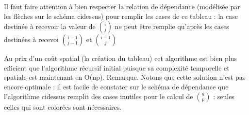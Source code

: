 \documentclass[letterpaper,10pt,english]{jupyterBook}
\begin{document}
\sphinxAtStartPar
Il faut faire attention à bien respecter la relation de dépendance (modélisée par les flèches
sur le schéma ci\sphinxhyphen{}dessus)
pour remplir les cases de ce tableau : la case destinée à recevoir la valeur de \(\binom{i}{j}\) ne peut être remplie qu’après les cases destinées à recevoi \(\binom{i-1}{j-1}\) et \(\binom{i-1}{j}\)
\begin{sphinxVerbatimInput}

\begin{sphinxVerbatim}[commandchars=\\\{\}]
   
             
           
        \PYG{p}{[} \PYG{p}{]}  
          
        \PYG{p}{[} \PYG{p}{]}  
          
               
            \PYG{p}{[} \PYG{p}{]}  \PYG{p}{[}     \PYG{p}{]}  \PYG{p}{[}  \PYG{p}{]}
     \PYG{p}{[} \PYG{p}{]}
\end{sphinxVerbatim}
\end{sphinxVerbatimInput}

\sphinxAtStartPar
Au prix d’un coût spatial (la création du tableau) cet algorithme est bien plus efficient que l’algorithme récursif initial puisque sa complexité temporelle et spatiale est maintenant en O(np).
Remarque. Notons que cette solution n’est pas encore optimale : il est facile de constater sur le schéma de dépendance que l’algorithme ci\sphinxhyphen{}dessus remplit des cases inutiles pour le calcul de \(\binom{n}  {p}\)  : seules celles qui sont colorées sont nécessaires.
\end{document}
